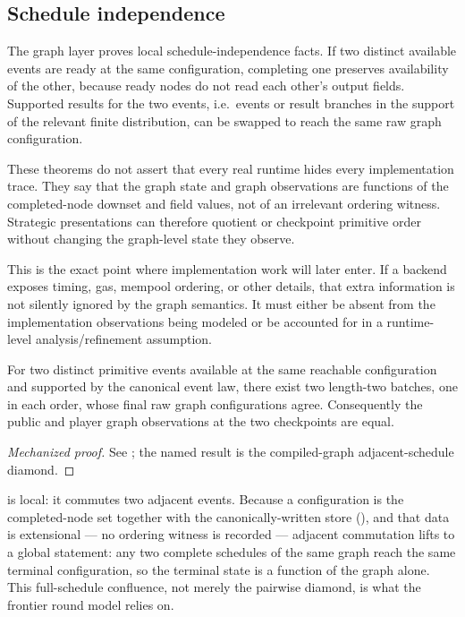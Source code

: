 \subsection{Schedule independence}
\label{sec:eg:diamond}

The graph layer proves local schedule-independence facts.  If two
distinct available events are ready at the same configuration, completing
one preserves availability of the other, because ready nodes do not read
each other's output fields.  Supported results for the two events, i.e.\
events or result branches in the support of the relevant finite
distribution, can be swapped to reach the same raw graph configuration.

These theorems do not assert that every real runtime hides every
implementation trace.  They say that the graph state and graph
observations are functions of the completed-node downset and field
values, not of an irrelevant ordering witness.  Strategic presentations
can therefore quotient or checkpoint primitive order without changing
the graph-level state they observe.

This is the exact point where implementation work will later enter.  If
a backend exposes timing, gas, mempool ordering, or other details, that
extra information is not silently ignored by the graph semantics.  It
must either be absent from the implementation observations being modeled
or be accounted for in a runtime-level analysis/refinement assumption.

\begin{theorem}
\label{thm:diamond}
For two distinct primitive events available at the same reachable
configuration and supported by the canonical event law, there exist two
length-two batches, one in each order, whose final raw graph
configurations agree.  Consequently the public and player graph
observations at the two checkpoints are equal.
\end{theorem}

\begin{proof}[Mechanized proof]
See ; the named result is the
compiled-graph adjacent-schedule diamond.
\end{proof}

 is local: it commutes two adjacent events.  Because a
configuration is the completed-node set together with the canonically-written
store (\Cref{sec:eg:configurations}), and that data is extensional --- no
ordering witness is recorded --- adjacent commutation lifts to a global
statement: any two complete schedules of the same graph reach the same terminal
configuration, so the terminal state is a function of the graph alone.  This
full-schedule confluence, not merely the pairwise diamond, is what the frontier
round model relies on.

